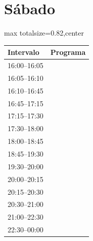 \documentclass[11pt,a4paper]{article}
\begin{document}
\section*{Sábado}
\begin{center}
\begin{adjustbox}{max totalsize={\textwidth}{0.82\textheight},center}
\begin{tabular}{|p{3.6cm}|p{11cm}|}
\hline
\textbf{Intervalo} & \textbf{Programa} \\
\hline
{\centering\rule{0pt}{0.93ex}16:00--16:05} & {\centering\rule{0pt}{0.93ex}} \\
{\centering\rule{0pt}{0.93ex}16:05--16:10} & {\centering\rule{0pt}{0.93ex}} \\
{\centering\rule{0pt}{6.53ex}16:10--16:45} & {\centering\rule{0pt}{6.53ex}} \\
{\centering\rule{0pt}{5.60ex}16:45--17:15} & {\centering\rule{0pt}{5.60ex}} \\
{\centering\rule{0pt}{2.80ex}17:15--17:30} & {\centering\rule{0pt}{2.80ex}} \\
{\centering\rule{0pt}{5.60ex}17:30--18:00} & {\centering\rule{0pt}{5.60ex}} \\
{\centering\rule{0pt}{8.40ex}18:00--18:45} & {\centering\rule{0pt}{8.40ex}} \\
{\centering\rule{0pt}{8.40ex}18:45--19:30} & {\centering\rule{0pt}{8.40ex}} \\
{\centering\rule{0pt}{5.60ex}19:30--20:00} & {\centering\rule{0pt}{5.60ex}} \\
{\centering\rule{0pt}{2.80ex}20:00--20:15} & {\centering\rule{0pt}{2.80ex}} \\
{\centering\rule{0pt}{2.80ex}20:15--20:30} & {\centering\rule{0pt}{2.80ex}} \\
{\centering\rule{0pt}{5.60ex}20:30--21:00} & {\centering\rule{0pt}{5.60ex}} \\
{\centering\rule{0pt}{16.80ex}21:00--22:30} & {\centering\rule{0pt}{16.80ex}} \\
{\centering\rule{0pt}{16.80ex}22:30--00:00} & {\centering\rule{0pt}{16.80ex}} \\
\hline
\end{tabular}
\end{adjustbox}
\end{center}

\clearpage
\end{document}
